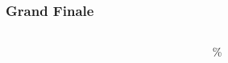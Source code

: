   \begin{frame}
    \frametitle{Grand Finale}
    \begin{columns}
    \begin{column}{0.3\textwidth}
       
    \end{column}
    \hfill%
    \begin{column}{0.3\textwidth}
        \fontsize{90}{72}\%
        {\textcolor{solarizedOrange}{\href{https://github.com/mccurdyc/mrstudyr}{\fontsize{90}{72}{\faGithub}}}}
    \end{column}
    \end{columns}
    \end{frame}
